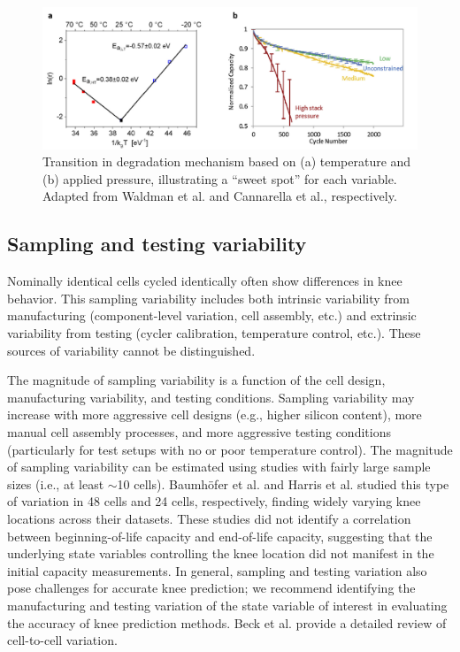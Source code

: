 \documentclass[journal=jpcl, manuscript=article, layout=onecolumn]{achemso}
\begin{document}
\begin{figure}[ht]
\centering
\includegraphics[scale = 0.7]{images/Temperature_and_pressure.png}
\caption{Transition in degradation mechanism based on (a) temperature and (b) applied pressure, illustrating a ``sweet spot'' for each variable. Adapted from Waldman et al.\cite{waldmann_temperature_2014} and Cannarella et al.\cite{cannarella_stress_2014}, respectively.}
\label{fig:temperature_and_pressure}
\end{figure}



\subsection{Sampling and testing variability}

Nominally identical cells cycled identically often show differences in knee behavior. This sampling variability includes both intrinsic variability from manufacturing (component-level variation, cell assembly, etc.) and extrinsic variability from testing (cycler calibration, temperature control, etc.). These sources of variability cannot be distinguished.

The magnitude of sampling variability is a function of the cell design, manufacturing variability, and testing conditions. Sampling variability may increase with more aggressive cell designs (e.g., higher silicon content), more manual cell assembly processes, and more aggressive testing conditions (particularly for test setups with no or poor temperature control). The magnitude of sampling variability can be estimated using studies with fairly large sample sizes (i.e., at least $\sim$10 cells). Baumhöfer et al.\cite{baumhofer_production_2014} and Harris et al.\cite{harris_failure_2017} studied this type of variation in 48 cells and 24 cells, respectively, finding widely varying knee locations across their datasets. These studies did not identify a correlation between beginning-of-life capacity and end-of-life capacity, suggesting that the underlying state variables controlling the knee location did not manifest in the initial capacity measurements. In general, sampling and testing variation also pose challenges for accurate knee prediction; we recommend identifying the manufacturing and testing variation of the state variable of interest in evaluating the accuracy of knee prediction methods. Beck et al.\cite{beck_inhomogeneities_2021} provide a detailed review of cell-to-cell variation.
\end{document}
